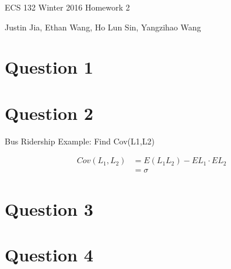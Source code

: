 \documentclass[11pt]{article}
\begin{document}
ECS 132 Winter 2016 Homework 2

Justin Jia, Ethan Wang, Ho Lun Sin, Yangzihao Wang

\section{Question 1}

\section{Question 2}

Bus Ridership Example: Find Cov(L1,L2)

\begin{align*}
Cov(L_1, L_2) &= E(L_1 L_2) - EL_1 \cdot EL_2\\
              &= \sigma
\end{align*}

\section{Question 3}

\section{Question 4}
\end{document}
